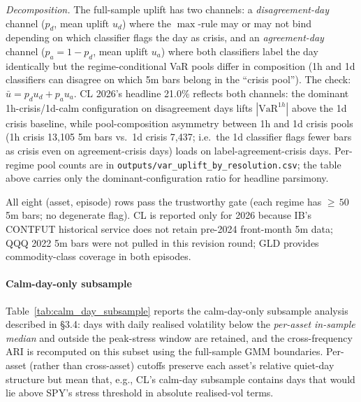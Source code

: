 \documentclass[preprint,12pt,authoryear]{elsarticle}
\newcommand{\CL}{CL}
\begin{document}
\begin{table}[H]
{\emph{Decomposition.} The full-sample uplift has two channels: a \emph{disagreement-day} channel ($p_d$, mean uplift $u_d$) where the $\max$-rule may or may not bind depending on which classifier flags the day as crisis, and an \emph{agreement-day} channel ($p_a = 1 - p_d$, mean uplift $u_a$) where both classifiers label the day identically but the regime-conditional VaR pools differ in composition (1h and 1d classifiers can disagree on which 5m bars belong in the ``crisis pool''). The check: $\bar{u} = p_d u_d + p_a u_a$. CL 2026's headline 21.0\% reflects both channels: the dominant 1h-crisis/1d-calm configuration on disagreement days lifts $|\text{VaR}^{1h}|$ above the 1d crisis baseline, while pool-composition asymmetry between 1h and 1d crisis pools (1h crisis 13{,}105 5m bars vs.\ 1d crisis 7{,}437; i.e.\ the 1d classifier flags fewer bars as crisis even on agreement-crisis days) loads on label-agreement-crisis days. Per-regime pool counts are in \texttt{outputs/var\_uplift\_by\_resolution.csv}; the table above carries only the dominant-configuration ratio for headline parsimony.

All eight (asset, episode) rows pass the trustworthy gate (each regime has ${\ge}\,50$ 5m bars; no degenerate flag). CL is reported only for 2026 because IB's CONTFUT historical service does not retain pre-2024 front-month 5m data; QQQ 2022 5m bars were not pulled in this revision round; GLD provides commodity-class coverage in both episodes.
\par}
\end{table}

\paragraph{Calm-day-only subsample}
Table~\ref{tab:calm_day_subsample} reports the calm-day-only subsample analysis described in \S{}3.4: days with daily realised volatility below the \emph{per-asset in-sample median} and outside the peak-stress window are retained, and the cross-frequency ARI is recomputed on this subset using the full-sample GMM boundaries. Per-asset (rather than cross-asset) cutoffs preserve each asset's relative quiet-day structure but mean that, e.g., \CL{}'s calm-day subsample contains days that would lie above SPY's stress threshold in absolute realised-vol terms.
\end{document}
